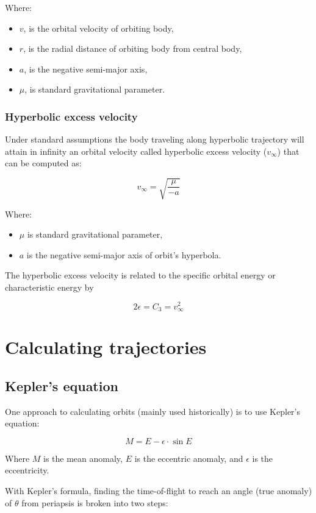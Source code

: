 \documentclass[12pt]{article}
\begin{document}
Where:

\begin{itemize}
  \item \(v\), is the orbital velocity of orbiting body,
  \item \(r\), is the radial distance of orbiting body from central body,
  \item \(a\), is the negative semi-major axis,
  \item \(\mu\), is standard gravitational parameter.
\end{itemize}

\subsubsection{Hyperbolic excess velocity}

Under standard assumptions the body traveling along hyperbolic trajectory will
attain in infinity an orbital velocity called hyperbolic excess velocity
(\(v_\infty\)) that can be computed as:

\[v_\infty=\sqrt{\frac{\mu}{-a}}\]

Where:

\begin{itemize}
  \item \(\mu\) is standard gravitational parameter,
  \item \(a\) is the negative semi-major axis of orbit's hyperbola.
\end{itemize}

The hyperbolic excess velocity is related to the specific orbital energy or
characteristic energy by

\[2\epsilon=C_3=v_{\infty}^2\]

\section{Calculating trajectories}

\subsection{Kepler's equation}

One approach to calculating orbits (mainly used historically) is to use
Kepler's equation:

\[M=E-\epsilon\cdot\sin E\]

Where \(M\) is the mean anomaly, \(E\) is the eccentric anomaly, and
\(\epsilon\) is the eccentricity.

With Kepler's formula, finding the time-of-flight to reach an angle (true
anomaly) of \(\theta\) from periapsis is broken into two steps:
\end{document}
